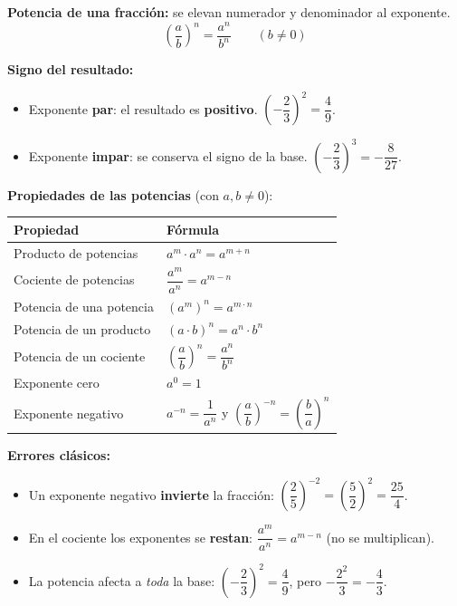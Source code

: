 \documentclass[12pt, letterpaper]{article}
\begin{document}
\begin{cuadroteoria}
  \textbf{Potencia de una fracción:} se elevan numerador y denominador al exponente.
  \[
    \left(\frac{a}{b}\right)^n = \frac{a^n}{b^n} \qquad (b \neq 0)
  \]

  \textbf{Signo del resultado:}
  \begin{itemize}[leftmargin=*]
    \item Exponente \textbf{par}: el resultado es \textbf{positivo}. \quad $\left(-\dfrac{2}{3}\right)^2 = \dfrac{4}{9}$.
    \item Exponente \textbf{impar}: se conserva el signo de la base. \quad $\left(-\dfrac{2}{3}\right)^3 = -\dfrac{8}{27}$.
  \end{itemize}
\end{cuadroteoria}

\begin{cuadroteoria}
  \textbf{Propiedades de las potencias} (con $a, b \neq 0$):
  \begin{center}
    \renewcommand{\arraystretch}{1.4}
    \begin{tabular}{ll}
      \toprule
      \textbf{Propiedad}       & \textbf{Fórmula}                                 \\
      \midrule
      Producto de potencias    & $a^m \cdot a^n = a^{m+n}$                        \\
      Cociente de potencias    & $\dfrac{a^m}{a^n} = a^{m-n}$                     \\
      Potencia de una potencia & $(a^m)^n = a^{m \cdot n}$                        \\
      Potencia de un producto  & $(a \cdot b)^n = a^n \cdot b^n$                  \\
      Potencia de un cociente  & $\left(\dfrac{a}{b}\right)^n = \dfrac{a^n}{b^n}$ \\
      Exponente cero           & $a^0 = 1$                                        \\
      Exponente negativo       & $a^{-n} = \dfrac{1}{a^n}$ \quad y \quad $\left(\dfrac{a}{b}\right)^{-n} = \left(\dfrac{b}{a}\right)^{n}$ \\
      \bottomrule
    \end{tabular}
  \end{center}
\end{cuadroteoria}

\begin{cuadroadvertencia}
  \textbf{Errores clásicos:}
  \begin{itemize}[leftmargin=*]
    \item Un exponente negativo \textbf{invierte} la fracción: $\left(\dfrac{2}{5}\right)^{-2} = \left(\dfrac{5}{2}\right)^2 = \dfrac{25}{4}$.
    \item En el cociente los exponentes se \textbf{restan}: $\dfrac{a^m}{a^n} = a^{m-n}$ (no se multiplican).
    \item La potencia afecta a \emph{toda} la base: $\left(-\dfrac{2}{3}\right)^2 = \dfrac{4}{9}$, pero $-\dfrac{2^2}{3} = -\dfrac{4}{3}$.
  \end{itemize}
\end{cuadroadvertencia}
\end{document}
